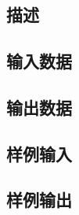 \ifx\allfiles\undefined

\fi


\section{}
\subsection*{描述}

\subsection*{输入数据}


\subsection*{输出数据}


\subsection*{样例输入}
\noindent 

\subsection*{样例输出}
\noindent 


\ifx\allfiles\undefined

\fi